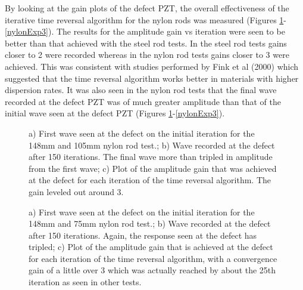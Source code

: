 \documentclass[11pt,letterpaper]{article}%
\begin{document}
By looking at the gain plots of the defect PZT, the overall effectiveness of the iterative time reversal algorithm for the nylon rods was measured (Figures \ref{nylonExp1}-\ref{nylonExp3}). The results for the amplitude gain vs iteration were seen to be better than that achieved with the steel rod tests. In the steel rod tests gains closer to 2 were recorded whereas in the nylon rod tests gains closer to 3 were achieved. This was consistent with studies performed by Fink et al (2000) which suggested that the time reversal algorithm works better in materials with higher dispersion rates. It was also seen in the nylon rod tests that the final wave recorded at the defect PZT was of much greater amplitude than that of the initial wave seen at the defect PZT (Figures \ref{nylonExp1}-\ref{nylonExp3}).

 \begin{figure}
\begin{subfigmatrix}{3}
\end{subfigmatrix}

   \caption[all]
   { \label{nylonExp1}
   a) First wave seen at the defect on the initial iteration for the 148mm and 105mm nylon rod test.; b) Wave recorded at the defect after 150 iterations. The final wave more than tripled in amplitude from the first wave; c) Plot of the amplitude gain that was achieved at the defect for each iteration of the time reversal algorithm. The gain leveled out around 3.
 }
\end{figure}

 \begin{figure}
\begin{subfigmatrix}{3}
\end{subfigmatrix}

   \caption[all]
   { \label{nylonExp2}
   a) First wave seen at the defect on the initial iteration for the 148mm and 75mm nylon rod test.; b) Wave recorded at the defect after 150 iterations. Again, the response seen at the defect has tripled; c) Plot of the amplitude gain that is achieved at the defect for each iteration of the time reversal algorithm, with a convergence gain of a little over 3 which was actually reached by about the 25th iteration as seen in other tests.
 }
\end{figure}
\end{document}
